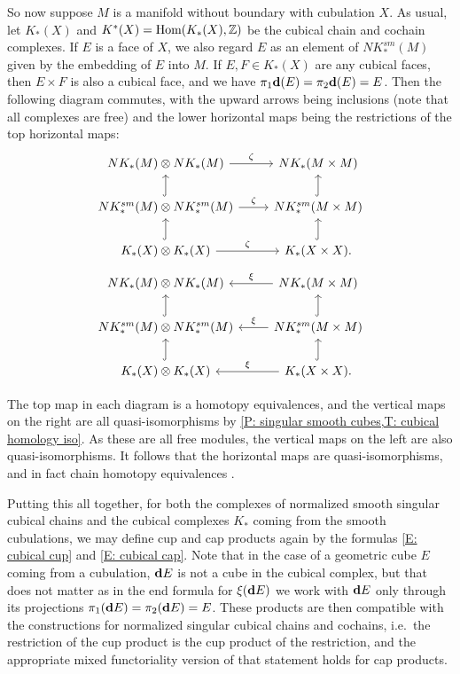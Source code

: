 So now suppose $M$ is a manifold without boundary with cubulation $X$.
As usual, let $K_*(X)$ and $K^*(X) = \textup{Hom}(K_*(X),\mathbb{Z})$ be the cubical chain and cochain complexes.
If $E$ is a face of $X$, we also regard $E$ as an element of $NK^{sm}_*(M)$ given by the embedding of $E$ into $M$.
If $E, F \in K_*(X)$ are any cubical faces, then $E \times F$ is also a cubical face, and  we have $\pi_1\mathbf{d}(E) = \pi_2\mathbf{d}(E) = E$.
Then the following diagram commutes, with the upward arrows being inclusions (note that all complexes are free) and the lower horizontal maps being the restrictions of the top horizontal maps:
\[
\begin{tikzcd}
	NK_*(M) \otimes NK_*(M) \arrow{r}{\zeta} & NK_*(M \times M) \\
	NK^{sm}_*(M) \otimes NK^{sm}_*(M) \arrow{r}{\zeta} \arrow[u, hook] & NK^{sm}_*(M \times M) \arrow[u, hook] \\
	K_*(X) \otimes K_*(X) \arrow{r}{\zeta} \arrow[u, hook] & K_*(X \times X). \arrow[u, hook]
\end{tikzcd}
\]
\[
\begin{tikzcd}
	NK_*(M) \otimes NK_*(M) & \arrow[l, "\xi"'] NK_*(M \times M) \\
	NK^{sm}_*(M) \otimes NK^{sm}_*(M) \arrow[u, hook] & \arrow[l, "\xi"'] NK^{sm}_*(M \times M) \arrow[u, hook] \\
	K_*(X) \otimes K_*(X) \arrow[u, hook] & \arrow[l, "\xi"'] K_*(X \times X). \arrow[u, hook]
\end{tikzcd}
\]

The top map in each diagram is a homotopy equivalences, and the vertical maps on the right are all quasi-isomorphisms by \cref{P: singular smooth cubes,T: cubical homology iso}.
As these are all free modules, the vertical maps on the left are also quasi-isomorphisms.
It follows that the horizontal maps are quasi-isomorphisms, and in fact chain homotopy equivalences \cite[Theorem 46.2]{Mun84}.

Putting this all together, for both the complexes of normalized smooth singular cubical chains and the cubical complexes $K_*$ coming from the smooth cubulations, we may define cup and cap products again by the formulas \eqref{E: cubical cup} and \eqref{E: cubical cap}.
Note that in the case of a geometric cube $E$ coming from a cubulation, $\mathbf{d} E$ is not a cube in the cubical complex, but that does not matter as in the end formula for $\xi(\mathbf{d} E)$ we work with $\mathbf{d} E$ only through its projections $\pi_1(\mathbf{d} E) = \pi_2(\mathbf{d} E) = E$.
These products are then compatible with the constructions for normalized singular cubical chains and cochains, i.e.\ the restriction of the cup product is the cup product of the restriction, and the appropriate mixed functoriality version of that statement holds for cap products.

